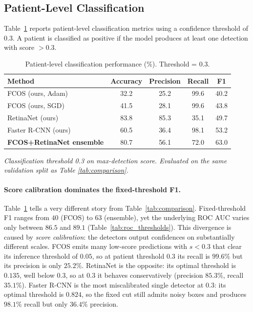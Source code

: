 \documentclass[11pt,a4paper]{article}
\begin{document}
\subsection{Patient-Level Classification}

Table~\ref{tab:patient_class} reports patient-level classification metrics using a confidence threshold of 0.3. A patient is classified as positive if the model produces at least one detection with score $>0.3$.

\begin{table}[H]
\centering
\caption{Patient-level classification performance (\%). Threshold = 0.3.}
\label{tab:patient_class}
\begin{tabular}{lcccc}
\toprule
Method & Accuracy & Precision & Recall & F1 \\
\midrule
FCOS (ours, Adam) & 32.2 & 25.2 & 99.6 & 40.2 \\
FCOS (ours, SGD) & 41.5 & 28.1 & 99.6 & 43.8 \\
RetinaNet (ours) & 83.8 & 85.3 & 35.1 & 49.7 \\
Faster R-CNN (ours) & 60.5 & 36.4 & 98.1 & 53.2 \\
\textbf{FCOS+RetinaNet ensemble} & 80.7 & 56.1 & 72.0 & 63.0 \\
\bottomrule
\end{tabular}
\vspace{0.3em}

\footnotesize\textit{Classification threshold 0.3 on max-detection score. Evaluated on the same validation split as Table \ref{tab:comparison}.}
\end{table}

\paragraph{Score calibration dominates the fixed-threshold F1.}
Table~\ref{tab:patient_class} tells a very different story from Table~\ref{tab:comparison}. Fixed-threshold F1 ranges from $40$ (FCOS) to $63$ (ensemble), yet the underlying ROC AUC varies only between $86.5$ and $89.1$ (Table~\ref{tab:roc_thresholds}). This divergence is caused by \emph{score calibration}: the detectors output confidences on substantially different scales. FCOS emits many low-score predictions with $s < 0.3$ that clear its inference threshold of $0.05$, so at patient threshold $0.3$ its recall is $99.6\%$ but its precision is only $25.2\%$. RetinaNet is the opposite: its optimal threshold is $0.135$, well below $0.3$, so at $0.3$ it behaves conservatively (precision $85.3\%$, recall $35.1\%$). Faster R-CNN is the most miscalibrated single detector at $0.3$: its optimal threshold is $0.824$, so the fixed cut still admits noisy boxes and produces $98.1\%$ recall but only $36.4\%$ precision.
\end{document}

